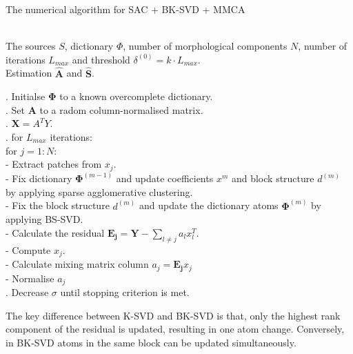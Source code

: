 \begin{algorithm}[!htbp] 
\caption{The numerical algorithm for SAC + BK-SVD + MMCA} 
\label{alg:Framwork} 
\begin{algorithmic}
\REQUIRE ~~\\%
The sources $S$, dictionary $\Phi$, number of morphological components $N$, number of iterations $L_{max}$ and threshold $\delta^{(0)} = k \cdot L_{max}$.
\ENSURE ~~\\ %
Estimation $\hat{\mathbf{A}}$ and $\hat{\mathbf{S}}$.

. Initialse $\mathbf{\Phi}$ to a known overcomplete dictionary.\\
. Set $\mathbf{A}$ to a radom column-normalised matrix.\\
. $\mathbf{X} = A^T Y$.\\

. for $L_{max}$ iterations:\\
\quad \quad for $j = 1:N$:\\
\quad \quad \quad - Extract patches from $x_j$.\\
\quad \quad \quad - Fix dictionary $\mathbf{\Phi}^{(m-1)}$ and update coefficients $x^{m}$ and block structure $d^{(m)}$ by applying sparse agglomerative clustering.\\
\quad \quad \quad- Fix the block structure $d^(m)$ and update the dictionary atoms $\mathbf{\Phi}^{(m)}$ by applying BS-SVD.\\
\quad \quad \quad - Calculate the residual $\mathbf{E_j} = \mathbf{Y} - \sum_{l\neq j}a_lx_l^T$. \\
\quad \quad \quad - Compute $x_j$. \\
\quad \quad \quad - Calculate mixing matrix column $a_j = \mathbf{E_j}x_j$ \\
\quad \quad \quad - Normalise $a_j$  \\
. Decrease $\sigma$ until stopping criterion is met. \\
\end{algorithmic}
\end{algorithm}
The key difference between K-SVD and BK-SVD is that, only the highest rank component of the residual is updated, resulting in one atom change. Conversely, in BK-SVD atoms in the same block can be updated simultaneously.

